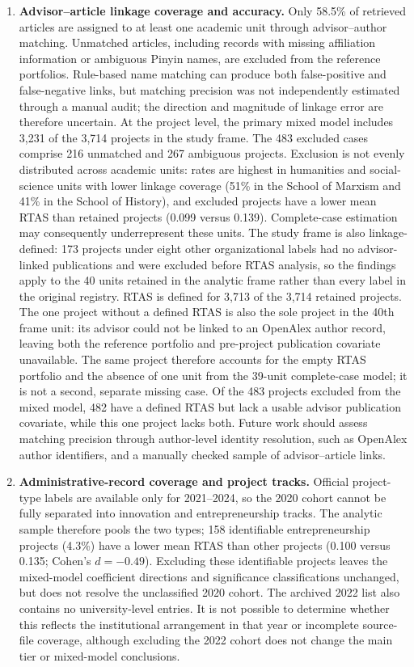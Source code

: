 \documentclass[pdflatex,sn-apa]{sn-jnl}
\begin{document}
\begin{enumerate}
\item \textbf{Advisor--article linkage coverage and accuracy.} Only 58.5\% of retrieved articles are assigned to at least one academic unit through advisor--author matching. Unmatched articles, including records with missing affiliation information or ambiguous Pinyin names, are excluded from the reference portfolios. Rule-based name matching can produce both false-positive and false-negative links, but matching precision was not independently estimated through a manual audit; the direction and magnitude of linkage error are therefore uncertain. At the project level, the primary mixed model includes 3,231 of the 3,714 projects in the study frame. The 483 excluded cases comprise 216 unmatched and 267 ambiguous projects. Exclusion is not evenly distributed across academic units: rates are highest in humanities and social-science units with lower linkage coverage (51\% in the School of Marxism and 41\% in the School of History), and excluded projects have a lower mean RTAS than retained projects (0.099 versus 0.139). Complete-case estimation may consequently underrepresent these units. The study frame is also linkage-defined: 173 projects under eight other organizational labels had no advisor-linked publications and were excluded before RTAS analysis, so the findings apply to the 40 units retained in the analytic frame rather than every label in the original registry. RTAS is defined for 3,713 of the 3,714 retained projects. The one project without a defined RTAS is also the sole project in the 40th frame unit: its advisor could not be linked to an OpenAlex author record, leaving both the reference portfolio and pre-project publication covariate unavailable. The same project therefore accounts for the empty RTAS portfolio and the absence of one unit from the 39-unit complete-case model; it is not a second, separate missing case. Of the 483 projects excluded from the mixed model, 482 have a defined RTAS but lack a usable advisor publication covariate, while this one project lacks both. Future work should assess matching precision through author-level identity resolution, such as OpenAlex author identifiers, and a manually checked sample of advisor--article links.

\item \textbf{Administrative-record coverage and project tracks.} Official project-type labels are available only for 2021--2024, so the 2020 cohort cannot be fully separated into innovation and entrepreneurship tracks. The analytic sample therefore pools the two types; 158 identifiable entrepreneurship projects (4.3\%) have a lower mean RTAS than other projects (0.100 versus 0.135; Cohen's $d=-0.49$). Excluding these identifiable projects leaves the mixed-model coefficient directions and significance classifications unchanged, but does not resolve the unclassified 2020 cohort. The archived 2022 list also contains no university-level entries. It is not possible to determine whether this reflects the institutional arrangement in that year or incomplete source-file coverage, although excluding the 2022 cohort does not change the main tier or mixed-model conclusions.


\end{enumerate}
\end{document}
